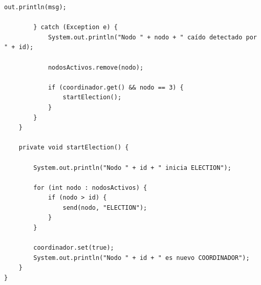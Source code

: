 \documentclass[12pt,a4paper]{article}
\begin{document}
\begin{lstlisting}[caption={Código completo de NodoDistribuido.java}]
            out.println(msg);

        } catch (Exception e) {
            System.out.println("Nodo " + nodo + " caído detectado por " + id);

            nodosActivos.remove(nodo);

            if (coordinador.get() && nodo == 3) {
                startElection();
            }
        }
    }

    private void startElection() {

        System.out.println("Nodo " + id + " inicia ELECTION");

        for (int nodo : nodosActivos) {
            if (nodo > id) {
                send(nodo, "ELECTION");
            }
        }

        coordinador.set(true);
        System.out.println("Nodo " + id + " es nuevo COORDINADOR");
    }
}
\end{lstlisting}
\end{document}

